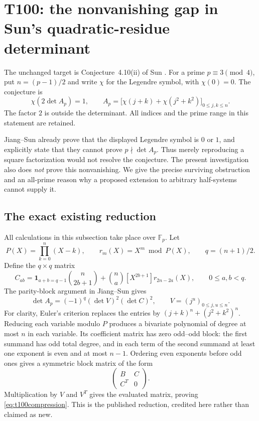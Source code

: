 \documentclass[11pt,a4paper]{article}
\theoremstyle{definition}
\theoremstyle{remark}
\begin{document}
\clearpage
\section{T100: the nonvanishing gap in Sun's quadratic-residue determinant}
\label{sec:t100}

The unchanged target is Conjecture~4.10(ii) of Sun
\cite{t100sun2024}. For a prime $p\equiv3\pmod4$, put $n=(p-1)/2$
and write $\chi$ for the Legendre symbol, with $\chi(0)=0$. The
conjecture is
\[
 \chi\!\left(2\det A_p\right)=1,
 \qquad
 A_p=\bigl[\chi(j+k)+\chi(j^2+k^2)\bigr]_{0\le j,k\le n}.
\]
The factor $2$ is outside the determinant. All indices and the prime
range in this statement are retained.

Jiang--Sun \cite[Theorem~1.1 and Remark~1.1]{t100jiangs2026}
already prove that the displayed Legendre symbol is $0$ or $1$, and
explicitly state that they cannot prove $p\nmid\det A_p$. Thus merely
reproducing a square factorization would not resolve the conjecture.
The present investigation also does \emph{not} prove this nonvanishing.
We give the precise surviving obstruction and an all-prime reason why
a proposed extension to arbitrary half-systems cannot supply it.

\subsection{The exact existing reduction}
All calculations in this subsection take place over $\mathbb F_p$.
Let
\[
 P(X)=\prod_{k=0}^{n}(X-k),\qquad
 r_m(X)=X^m\bmod P(X),\qquad q=(n+1)/2.
\]
Define the $q\times q$ matrix
\[
 C_{ab}=
 \mathbf1_{a+b=q-1}\binom n{2b+1}
 +\binom na[X^{2b+1}]r_{2n-2a}(X),
 \qquad 0\le a,b<q.
\]
The parity-block argument in Jiang--Sun gives
\begin{equation}\label{eq:t100compression}
 \det A_p=(-1)^q(\det V)^2(\det C)^2,
 \qquad V=(j^u)_{0\le j,u\le n}.
\end{equation}
For clarity, Euler's criterion replaces the entries by
$(j+k)^n+(j^2+k^2)^n$. Reducing each variable modulo $P$ produces
a bivariate polynomial of degree at most $n$ in each variable. Its
coefficient matrix has zero odd--odd block: the first summand has odd
total degree, and in each term of the second summand at least one
exponent is even and at most $n-1$. Ordering even exponents before odd
ones gives a symmetric block matrix of the form
\[
 \begin{pmatrix} B&C\\ C^T&0\end{pmatrix}.
\]
Multiplication by $V$ and $V^T$ gives the evaluated matrix, proving
\eqref{eq:t100compression}. This is the published reduction, credited
here rather than claimed as new.
\end{document}

